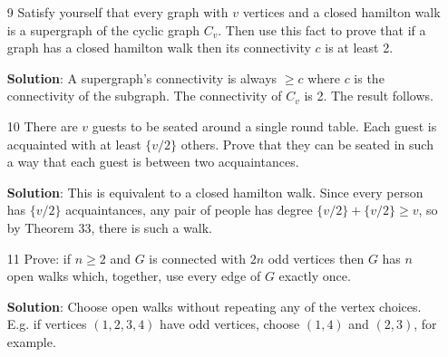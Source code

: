 \documentclass{article}
\begin{document}
\begin{enumerate}
		\item[9] Satisfy yourself that every graph with $v$ vertices and a closed hamilton walk is a supergraph of the cyclic graph $C_v$. Then use this fact to prove that if a graph has a closed hamilton walk then its connectivity $c$ is at least 2.
		
		\textbf{Solution}: A supergraph's connectivity is always $\geq c$ where $c$ is the connectivity of the subgraph. The connectivity of $C_v$ is 2. The result follows.
		
		\item[10] There are $v$ guests to be seated around a single round table. Each guest is acquainted with at least $\{v/2\}$ others. Prove that they can be seated in such a way that each guest is between two acquaintances.
		
		\textbf{Solution}: This is equivalent to a closed hamilton walk. Since every person has $\{v/2\}$ acquaintances, any pair of people has degree $\{v/2\} + \{v/2\} \geq v$, so by Theorem 33, there is such a walk.
		
		\item[11] Prove: if $n \geq 2$ and $G$ is connected with $2n$ odd vertices then $G$ has $n$ open walks which, together, use every edge of $G$ exactly once.
		
		\textbf{Solution}: Choose open walks without repeating any of the vertex choices. E.g. if vertices $(1, 2, 3, 4)$ have odd vertices, choose $(1, 4)$ and $(2, 3)$, for example.
	\end{enumerate}
\end{document}
